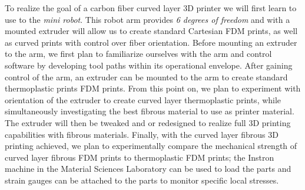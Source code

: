 \documentclass[letter,10pt,english]{article}
\begin{document}
To realize the goal of a carbon fiber curved layer 3D printer we will first learn to use to the \emph{mini robot}. This robot arm provides \emph{6 degrees of freedom} and with a mounted extruder will allow us to create standard Cartesian FDM prints, as well as curved prints with control over fiber orientation. Before mounting an extruder to the arm, we first plan to familiarize ourselves with the arm and control software by developing tool paths within its operational envelope. After gaining control of the arm, an extruder can be mounted to the arm to create standard thermoplastic prints FDM prints. From this point on, we plan to experiment with orientation of the extruder to create curved layer thermoplastic prints, while simultaneously investigating the best fibrous material to use as printer material. The extruder will then be tweaked and or redesigned to realize full 3D printing capabilities with fibrous materials. Finally, with the curved layer fibrous 3D printing achieved, we plan to experimentally compare the mechanical strength of curved layer fibrous FDM prints to thermoplastic FDM prints; the Instron machine in the Material Sciences Laboratory can be used to load the parts and strain gauges can be attached to the parts to monitor specific local stresses.

\end{document}
